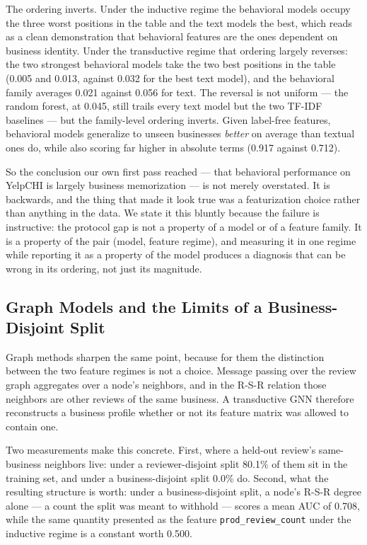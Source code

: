\documentclass[conference]{IEEEtran}
\begin{document}
The ordering inverts. Under the inductive regime the behavioral models occupy
the three worst positions in the table and the text models the best, which reads
as a clean demonstration that behavioral features are the ones dependent on
business identity. Under the transductive regime that ordering
largely reverses: the two strongest behavioral models take the two best
positions in the table (0.005 and 0.013, against 0.032 for the best text model),
and the behavioral family averages 0.021 against 0.056 for text. The reversal is
not uniform --- the random forest, at 0.045, still trails every text model but
the two TF-IDF baselines --- but the family-level ordering inverts. Given
label-free features, behavioral models generalize to unseen businesses
\textit{better} on average than textual ones do, while also scoring far higher
in absolute terms (0.917 against 0.712).

So the conclusion our own first pass reached --- that behavioral performance on
YelpCHI is largely business memorization --- is not merely overstated. It is
backwards, and the thing that made it look true was a featurization choice
rather than anything in the data. We state it this bluntly because the failure
is instructive: the protocol gap is not a property of a model or of a feature
family. It is a property of the pair (model, feature regime), and measuring it
in one regime while reporting it as a property of the model produces a
diagnosis that can be wrong in its ordering, not just its magnitude.

\subsection{Graph Models and the Limits of a Business-Disjoint Split}
\label{sec:graph}

Graph methods sharpen the same point, because for them the distinction between
the two feature regimes is not a choice. Message passing over the review graph
aggregates over a node's neighbors, and in the R-S-R relation those neighbors
are other reviews of the same business. A transductive GNN therefore reconstructs
a business profile whether or not its feature matrix was allowed to contain one.

Two measurements make this concrete. First, where a held-out review's
same-business neighbors live: under a reviewer-disjoint split
80.1\% of them sit in the training set, and under a
business-disjoint split 0.0\% do. Second, what the resulting
structure is worth: under a business-disjoint split, a node's R-S-R degree
alone --- a count the split was meant to withhold --- scores a mean AUC of
0.708, while the same quantity presented as the feature \texttt{prod\_review\_count} under the
inductive regime is a constant worth 0.500.
\end{document}
